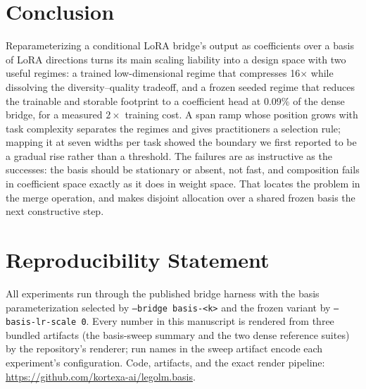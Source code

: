 \documentclass[11pt]{article}
\begin{document}
\section{Conclusion}
Reparameterizing a conditional LoRA bridge's output as coefficients over a basis of LoRA directions turns its main scaling liability into a design space with two useful regimes: a trained low-dimensional regime that compresses 16$\times$ while dissolving the diversity--quality tradeoff, and a frozen seeded regime that reduces the trainable and storable footprint to a coefficient head at 0.09\% of the dense bridge, for a measured $2\times$ training cost. A span ramp whose position grows with task complexity separates the regimes and gives practitioners a selection rule; mapping it at seven widths per task showed the boundary we first reported to be a gradual rise rather than a threshold. The failures are as instructive as the successes: the basis should be stationary or absent, not fast, and composition fails in coefficient space exactly as it does in weight space. That locates the problem in the merge operation, and makes disjoint allocation over a shared frozen basis the next constructive step.

\section*{Reproducibility Statement}
All experiments run through the published bridge harness with the basis parameterization selected by \texttt{--bridge basis-<k>} and the frozen variant by \texttt{--basis-lr-scale 0}. Every number in this manuscript is rendered from three bundled artifacts (the basis-sweep summary and the two dense reference suites) by the repository's renderer; run names in the sweep artifact encode each experiment's configuration. Code, artifacts, and the exact render pipeline: \url{https://github.com/kortexa-ai/legolm.basis}.



\end{document}
